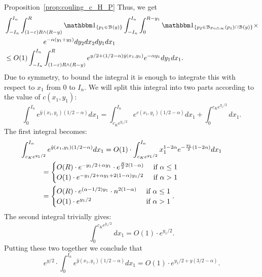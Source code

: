 \begin{proofof}{Proposition~\ref{prop:couling_c_H_P}}
Thus, we get
\begin{align*}
	&\int_{-I_n}^{I_n} \int_{(1-\eps) R \wedge (R-y)}^{R} \ind{p_1 \in \BallHyp{y}}
		\int_{-I_n}^{I_n} \int_{0}^{R-y_1} 
		\ind{p_2 \in \BallSym{p_1} \cap \BallHyp{y}} \times \\ 
	& \hspace{2cm}  e^{-\alpha(y_1 + y_2)} dy_2 dx_2 dy_1 dx_1 \\
	&\leq O(1) \int_{-I_n}^{I_n} \int_{(1-\eps) R \wedge (R-y)}^{R} 
		e^{y/2 + (1/2 -\alpha) \hat{y}(x_1,y_1)} e^{-\alpha y_1} dy_1 dx_1. 
\end{align*}
Due to symmetry, to bound the integral it is enough to integrate this with respect to $x_1$ from 0 to $I_n$.
We will split this integral into two parts according to the value of $c(x_1,y_1)$:
\[
	\int_0^{I_n} e^{\hat{y}(x_1,y_1) (1/2 -\alpha)} dx_1 = 
	\int_{c_K e^{y_1/2}}^{I_n} e^{c(x_1,y_1) (1/2 -\alpha)} dx_1 + \int_0^{c_K e^{y_1/2}} dx_1.
\]
The first integral becomes: 
\begin{align*}
	&\hspace{-30pt}\int_{c_K e^{y_1/2}}^{I_n} e^{\hat{y}(x_1,y_1) (1/2 -\alpha)} dx_1  = 
 		O(1)\cdot \int_{c_K e^{y_1/2}}^{I_n} x_1^{1 -2\alpha} 
		e^{-\frac{y_1}{2} (1-2\alpha)} dx_1 \\
	&= \begin{cases}
		O(R) \cdot e^{-y_1/2 + \alpha y_1} \cdot e^{\frac{R}{2} 2(1-\alpha)} & \ \mbox{if $\alpha \leq 1$}\\
		O(1) \cdot e^{-y_1/2 + \alpha y_1 + 2(1-\alpha)y_1/2} & \ \mbox{if $\alpha > 1$}
		\end{cases}\\
	&=\begin{cases}
		O(R) \cdot e^{(\alpha -1/2) y_1} \cdot n^{2(1-\alpha)} & \ \mbox{if $\alpha \leq 1$}\\
		O(1) \cdot e^{y_1/2} &\ \mbox{if $\alpha > 1$}
	\end{cases}.  
\end{align*}
The second integral trivially gives: 
\[
	\int_0^{c_K e^{y_1/2}} dx_1 = O(1) \cdot e^{y_1/2}.
\]
Putting these two together we conclude that 
\[
	e^{y/2} \cdot \int_0^{I_n} e^{\hat{y}(x_1,y_1) (1/2 -\alpha)} dx_1
	= O(1) \cdot e^{y_1/2 +y(3/2-\alpha)}.
\]


\end{proofof}
